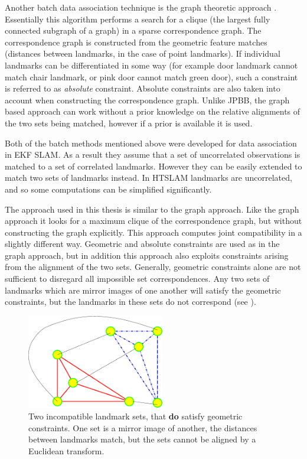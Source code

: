 Another batch data association technique is the graph theoretic
approach \cite{tardos02:_mappin_local_indoor_envir_using_sonar_data}.
Essentially this algorithm performs a search for a clique (the largest
fully connected subgraph of a graph) in a sparse correspondence graph.
The correspondence graph is constructed from the geometric feature
matches (distances between landmarks, in the case of point landmarks).
If individual landmarks can be differentiated in some way (for example
door landmark cannot match chair landmark, or pink door cannot match
green door), such a constraint is referred to as {\it absolute}
constraint. Absolute constraints are also taken into account when
constructing the correspondence graph. Unlike JPBB, the graph based
approach can work without a prior knowledge on the relative alignments
of the two sets being matched, however if a prior is available it is
used.

Both of the batch methods mentioned above were developed for data
association in EKF SLAM. As a result they assume that a set of
uncorrelated observations is matched to a set of correlated
landmarks. However they can be easily extended to match two sets of
landmarks instead. In HTSLAM landmarks are uncorrelated, and so some
computations can be simplified significantly.


The approach used in this thesis is similar to the graph
approach. Like the graph approach it looks for a maximum clique of the
correspondence graph, but without constructing the graph explicitly.
This approach computes joint compatibility in a slightly different
way. Geometric and absolute constraints are used as in the graph
approach, but in addition this approach also exploits constraints
arising from the alignment of the two sets. Generally, geometric
constraints alone are not sufficient to disregard all impossible set
correspondences. Any two sets of landmarks which are mirror images of
one another will satisfy the geometric constraints, but the landmarks
in these sets do not correspond (see ).

\begin{figure}[htbp]
  \centering
  \includegraphics[width=6cm]{Pics/fig_mirror_sets}
  \caption{Two incompatible landmark sets, that {\bf do} satisfy
    geometric constraints. One set is a mirror image of another, the
    distances between landmarks match, but the sets cannot be aligned
    by a Euclidean transform.
}
  \label{fig:mirror_sets}
\end{figure}

